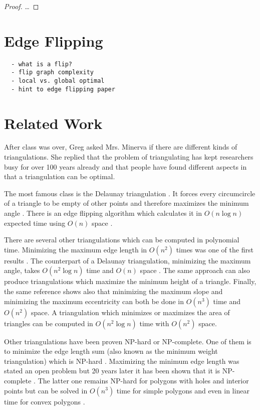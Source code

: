\begin{proof}
  \ldots{}
\end{proof}


\section{Edge Flipping}
\begin{verbatim}
  - what is a flip?
  - flip graph complexity
  - local vs. global optimal
  - hint to edge flipping paper
\end{verbatim}

\section{Related Work}
After class was over, Greg asked Mrs. Minerva if there are different
kinds of triangulations. She replied that the problem of 
triangulating has kept researchers busy for over 100 years already
\cite{triangulation_hilbert} and that people have found different
aspects in that a triangulation can be optimal.

The most famous class is the Delaunay triangulation
\cite[Section 9.2]{deberg_compgeom}. It forces every circumcircle
of a triangle to be empty of other points and therefore maximizes
the minimum angle \cite[Theorem 9.9]{deberg_compgeom}. There is an
edge flipping algorithm which calculates it in \(O(n \log n)\) 
expected time using \(O(n)\) space 
\cite[Theorem 9.12]{deberg_compgeom}.

There are several other triangulations which can be computed in
polynomial time. Minimizing the maximum edge length in \(O(n^2)\)
times was one of the first results \cite{triangulation_minmax_length}.
The counterpart of a Delaunay triangulation, 
minimizing the maximum angle, takes \(O(n^2 \log n)\) time and
\(O(n)\) space \cite{triangulation_edge_insertion}. The same
approach can also produce triangulations which maximize the minimum 
height of a triangle. Finally, the same reference shows also that 
minimizing the maximum slope and minimizing the maximum eccentricity 
can both be done in \(O(n^3)\) time and \(O(n^2)\) space. A 
triangulation which minimizes or maximizes the area of triangles can
be computed in \(O(n^2 \log n)\) time with \(O(n^2)\) space.
\cite{triangulation_area}

Other triangulations have been proven NP-hard or NP-complete. One
of them is to minimize the edge length sum (also known as the minimum
weight triangulation) which is NP-hard \cite{mwt_complexity}. 
Maximizing the minimum edge length was stated an open problem
\cite{triangulation_minmax_length} but 20 years later it has been
shown that it is NP-complete \cite{mmlt_complexity}. The latter one
remains NP-hard for polygons with holes and interior points
\cite{mmlt_polygons} but can be solved in \(O(n^3)\) time for simple
polygons and even in linear time for convex polygons
\cite{mmlt_convex_polygons}.

